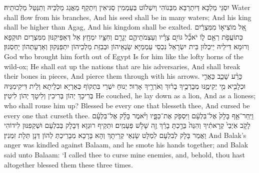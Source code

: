 {יִסְגֵּי מַלְכָּא דְּיִתְרַבַּא מִבְּנוֹהִי וְיִשְׁלוֹט בְּעַמְמִין סַגִּיאִין וְיִתְקַף מֵאֲגַג מַלְכֵּיהּ וְתִנַּטַּל מַלְכוּתֵיהּ׃}
{Water shall flow from his branches, And his seed shall be in many waters; And his king shall be higher than Agag, And his kingdom shall be exalted.}{}
{אֵ֚ל מוֹצִיא֣וֹ מִמִּצְרַ֔יִם כְּתוֹעֲפֹ֥ת רְאֵ֖ם ל֑וֹ יֹאכַ֞ל גּוֹיִ֣ם צָרָ֗יו וְעַצְמֹתֵיהֶ֛ם יְגָרֵ֖ם וְחִצָּ֥יו יִמְחָֽץ׃
}
{אֵל דְּאַפֵּיקִנּוּן מִמִּצְרַיִם תּוּקְפָא וְרוּמָא דִּילֵיהּ יֵיכְלוּן בֵּית יִשְׂרָאֵל נִכְסֵי עַמְמַיָּא שָׂנְאֵיהוֹן וּבְבִזַּת מַלְכֵיהוֹן יִתְפַּנְּקוּן וְאַרְעָתְהוֹן יַחְסְנוּן׃}
{God who brought him forth out of Egypt Is for him like the lofty horns of the wild-ox; He shall eat up the nations that are his adversaries, And shall break their bones in pieces, And pierce them through with his arrows.}{}
{כָּרַ֨ע שָׁכַ֧ב כַּאֲרִ֛י וּכְלָבִ֖יא מִ֣י יְקִימֶ֑נּוּ מְבָרְכֶ֣יךָ בָר֔וּךְ וְאֹרְרֶ֖יךָ אָרֽוּר׃
}
{יְנוּחַ יִשְׁרֵי בִּתְקוֹף כְּאַרְיָא וּכְלֵיתָא וְלֵית דִּיקִימִנֵּיהּ בְּרִיכָךְ יְהוֹן בְּרִיכִין וְלִיטָךְ יְהוֹן לִיטִין׃}
{He couched, he lay down as a lion, And as a lioness; who shall rouse him up? Blessed be every one that blesseth thee, And cursed be every one that curseth thee.}{}
{וַיִּֽחַר־אַ֤ף בָּלָק֙ אֶל־בִּלְעָ֔ם וַיִּסְפֹּ֖ק אֶת־כַּפָּ֑יו וַיֹּ֨אמֶר בָּלָ֜ק אֶל־בִּלְעָ֗ם לָקֹ֤ב אֹֽיְבַי֙ קְרָאתִ֔יךָ וְהִנֵּה֙ בֵּרַ֣כְתָּ בָרֵ֔ךְ זֶ֖ה שָׁלֹ֥שׁ פְּעָמִֽים׃
}
{וּתְקֵיף רוּגְזָא דְּבָלָק בְּבִלְעָם וּשְׁקַפִנּוּן לִידוֹהִי וַאֲמַר בָּלָק לְבִלְעָם לִמְלָט שָׂנְאַי קְרֵיתָךְ וְהָא בָּרָכָא מְבָרֵיכְתְּ לְהוֹן דְּנָן תְּלָת זִמְנִין׃}
{And Balak’s anger was kindled against Balaam, and he smote his hands together; and Balak said unto Balaam: ‘I called thee to curse mine enemies, and, behold, thou hast altogether blessed them these three times.}{}

